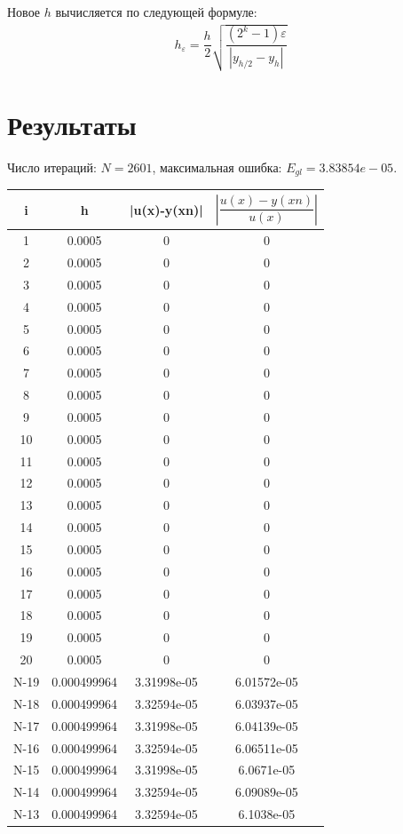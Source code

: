 \documentclass[10pt,a4paper,oneside,russian]{article}
\begin{document}
Новое $h$ вычисляется по следующей формуле:
\begin{align*}
  h_{\varepsilon} = \dfrac{h}{2}\sqrt{\dfrac{(2^k - 1)\varepsilon}{\left|y_{h/2} - y_h\right|}}
\end{align*}

\section{Результаты}
Число итераций: $N = 2601$, максимальная ошибка: $E_{gl} = 3.83854e-05$.\\
  \begin{tabular}{|c|c|c|c|}
    \hline
    i &h &|u(x)-y(xn)| &$\left|\dfrac{u(x) - y(xn)}{u(x)}\right|$\\\hline
1&0.0005&0&0\\ \hline
2&0.0005&0&0\\ \hline
3&0.0005&0&0\\ \hline
4&0.0005&0&0\\ \hline
5&0.0005&0&0\\ \hline
6&0.0005&0&0\\ \hline
7&0.0005&0&0\\ \hline
8&0.0005&0&0\\ \hline
9&0.0005&0&0\\ \hline
10&0.0005&0&0\\ \hline
11&0.0005&0&0\\ \hline
12&0.0005&0&0\\ \hline
13&0.0005&0&0\\ \hline
14&0.0005&0&0\\ \hline
15&0.0005&0&0\\ \hline
16&0.0005&0&0\\ \hline
17&0.0005&0&0\\ \hline
18&0.0005&0&0\\ \hline
19&0.0005&0&0\\ \hline
20&0.0005&0&0\\ \hline
N-19&0.000499964&3.31998e-05&6.01572e-05\\ \hline
N-18&0.000499964&3.32594e-05&6.03937e-05\\ \hline
N-17&0.000499964&3.31998e-05&6.04139e-05\\ \hline
N-16&0.000499964&3.32594e-05&6.06511e-05\\ \hline
N-15&0.000499964&3.31998e-05&6.0671e-05\\ \hline
N-14&0.000499964&3.32594e-05&6.09089e-05\\ \hline
N-13&0.000499964&3.32594e-05&6.1038e-05\\ \hline

\end{tabular}
\end{document}
